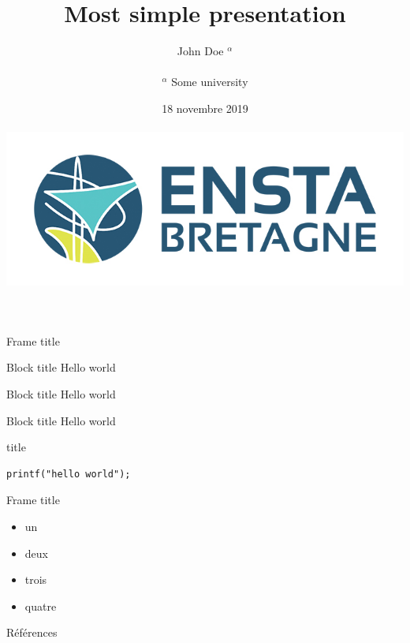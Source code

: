 \documentclass[aspectratio=169]{beamer}
\begin{document}
\title{Most simple presentation}
\author{John Doe $^{\alpha}$\\~\\
\small{$^{\alpha}$ Some university}} 
\date{18 novembre 2019\\~\\\includegraphics[width=.5\textwidth]{images/ensta-couleur}} 
\frame[plain]{\titlepage} 

\begin{frame}{Frame title}
\begin{exampleblock}{Block title}
Hello world
\end{exampleblock}
\begin{block}{Block title}
Hello world 
\end{block}
\begin{alertblock}{Block title}
Hello world \cite{Feynman1941}
\end{alertblock}
\end{frame}
\begin{frame}[fragile]{title}
\begin{lstlisting}[style=customc]
printf("hello world");
\end{lstlisting}
\end{frame}
\begin{frame}{Frame title}
	\begin{itemize}
		\item un
		\item deux
		\item trois
		\item quatre
	\end{itemize}
\end{frame}
\begin{frame}{Références}
\printbibliography
\end{frame}
\end{document}
